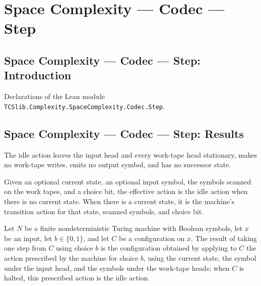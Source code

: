 \section{Space Complexity --- Codec --- Step}
\subsection*{Space Complexity --- Codec --- Step: Introduction}

Declarations of the Lean module \texttt{TCSlib.Complexity.SpaceComplexity.Codec.Step}.

\subsection*{Space Complexity --- Codec --- Step: Results}

\begin{definition}
\label{Complexity.Codec.idleAct}
\leanok
{}
The idle action leaves the input head and every work-tape head stationary, makes no
work-tape writes, emits no output symbol, and has no successor state.
\end{definition}

\begin{definition}
\label{Complexity.Codec.effAct}
\leanok
{}
Given an optional current state, an optional input symbol, the symbols scanned on the
work tapes, and a choice bit, the effective action is the idle action when there is no
current state. When there is a current state, it is the machine's transition action for
that state, scanned symbols, and choice bit.
\end{definition}

\begin{theorem}
\label{Complexity.Codec.stepWith_eq_apply}
\leanok
{}
Let $N$ be a finite nondeterministic Turing machine with Boolean symbols, let $x$ be an
input, let $b\in\{0,1\}$, and let $C$ be a configuration on $x$. The result of taking
one step from $C$ using choice $b$ is the configuration obtained by applying to $C$ the
action prescribed by the machine for choice $b$, using the current state, the symbol
under the input head, and the symbols under the work-tape heads; when $C$ is halted,
this prescribed action is the idle action.
\end{theorem}

